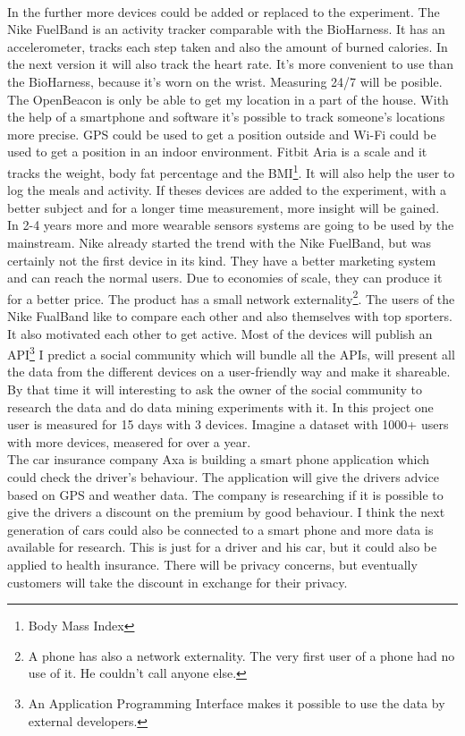 	\\
	In the further more devices could be added or replaced to the experiment. The Nike FuelBand\cite{fuelband} is an activity tracker comparable with the BioHarness. It has an accelerometer, tracks each step taken and also the amount of burned calories. In the next version it will also track the heart rate\cite{fuelband2}. It's more convenient to use than the BioHarness, because it's worn on the wrist. Measuring 24/7 will be posible. The OpenBeacon is only be able to get my location in a part of the house. With the help of a smartphone and software it's possible to track someone's locations more precise. GPS could be used to get a position outside and Wi-Fi could be used to get a position in an indoor environment\cite{Howard-2003-283}. Fitbit Aria\cite{aria} is a scale and it tracks the weight, body fat percentage and the BMI\footnote{Body Mass Index}. It will also help the user to log the meals and activity. If theses devices are added to the experiment, with a better subject and for a longer time measurement, more insight will be gained.
	\\
	In 2-4 years more and more wearable sensors systems are going to be used by the mainstream. Nike already started the trend with the Nike FuelBand, but was certainly not the first device in its kind. They have a better marketing system and can reach the normal users. Due to economies of scale, they can produce it for a better price. The product has a small network externality\footnote{A phone has also a network externality. The very first user of a phone had no use of it. He couldn't call anyone else.}. The users of the Nike FualBand like to compare each other and also themselves with top sporters. It also motivated each other to get active. Most of the devices will publish an API\footnote{An Application Programming Interface makes it possible to use the data by external developers.} I predict a social community which will bundle all the APIs, will present all the data from the different devices on a user-friendly way and make it shareable. By that time it will interesting to ask the owner of the social community to research the data and do data mining experiments with it. In this project one user is measured for 15 days with 3 devices. Imagine a dataset with 1000+ users with more devices, measered for over a year.
	\\	
	The car insurance company Axa is building a smart phone application which could check the driver's behaviour\cite{axa}. The application will give the drivers advice based on GPS and weather data. The company is researching if it is possible to give the drivers a discount on the premium by good behaviour. I think the next generation of cars could also be connected to a smart phone and more data is available for research. This is just for a driver and his car, but it could also be applied to health insurance. There will be privacy concerns, but eventually customers will take the discount in exchange for their privacy. 
